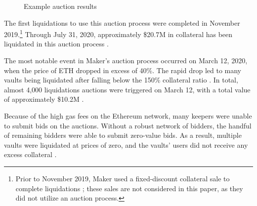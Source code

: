 \documentclass[conference]{IEEEtran}
\begin{document}
\begin{center}
    \begin{figure}[htb]
        \caption{Example auction results}
        \label{fig:auctionResults}
    \end{figure}
\end{center}

The first liquidations to use this auction process were completed in November 2019.\footnote{Prior to November 2019, Maker used a fixed-discount collateral sale to complete liquidations \cite{scdLiquidations}; these sales are not considered in this paper, as they did not utilize an auction process.} Through July 31, 2020, approximately \$20.7M in collateral has been liquidated in this auction process \cite{liquidationVol}.

The most notable event in Maker's auction process occurred on March 12, 2020, when the price of ETH dropped in excess of 40\%. The rapid drop led to many vaults being liquidated after falling below the 150\% collateral ratio \cite{blackThursdayReport}. In total, almost 4,000 liquidations auctions were triggered on March 12, with a total value of approximately \$10.2M \cite{liquidationVol}.

Because of the high gas fees on the Ethereum network, many keepers were unable to submit bids on the auctions. Without a robust network of bidders, the handful of remaining bidders were able to submit zero-value bids. As a result, multiple vaults were liquidated at prices of zero, and the vaults' users did not receive any excess collateral \cite{blackThursdayReport}.
\end{document}
